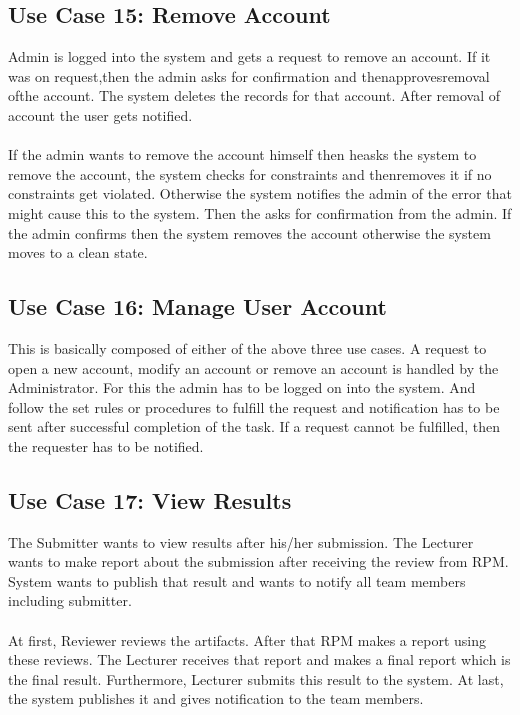     
    
    
    
    
    \subsection*{Use Case 15: Remove Account }
    Admin is logged into the system and gets a request to remove an account. If it was on request,then the admin asks for confirmation and thenapprovesremoval ofthe account. The system deletes the records for that account. After removal of account the user gets notified. 
    \\
    \\
    If the admin wants to remove the account himself then heasks the system to remove the account, the system checks for constraints and thenremoves it if no constraints get violated. Otherwise the system notifies the admin of the error that might cause this to the system. Then the asks for confirmation from the admin. If the admin confirms then the system removes the account otherwise the system moves to a clean state.
    
    
    
    
    
    
    \subsection*{Use Case 16: Manage User Account}
    This is basically composed of either of the above three use cases. A request to open a new account, modify an account or remove an account is handled by the Administrator. For this the admin has to be logged on into the system. And follow the set rules or procedures to fulfill the request and notification has to be sent after successful completion of the task. If a request cannot be fulfilled, then the requester has to be notified.
    
    
    
    
    
    
    \subsection*{Use Case 17: View Results}
    The Submitter wants to view results after his/her submission. The Lecturer wants to make report about the submission after receiving the review from RPM. System wants to publish that result and wants to notify all team members including submitter.
    \\
    \\
    At first, Reviewer reviews the artifacts. After that RPM makes a report using these reviews. The Lecturer  receives  that  report  and  makes  a  final  report  which  is  the  final  result. Furthermore, Lecturer submits this result to the system. At last, the system publishes it and gives notification to the team members.
    
